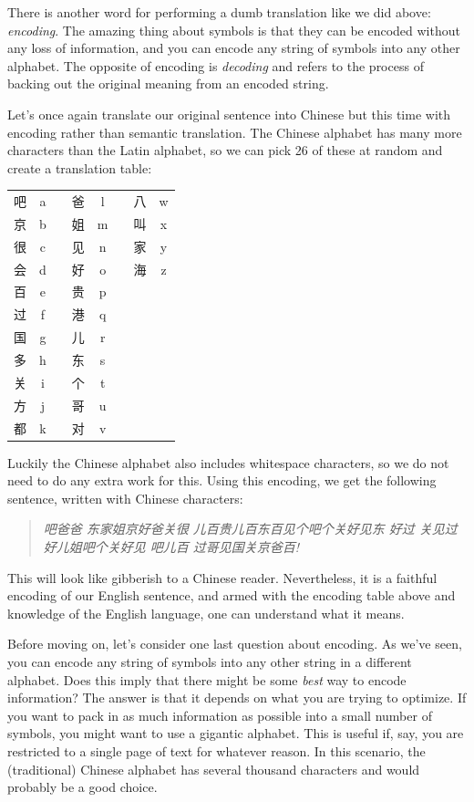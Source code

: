 \documentclass[UTF8]{book}
\begin{document}
\begin{CJK}{UTF8}{gbsn}
There is another word for performing a dumb translation like we did above: \emph{encoding}. The amazing thing about symbols is that they can be encoded without any loss of information, and you can encode any string of symbols into any other alphabet. The opposite of encoding is \emph{decoding} and refers to the process of backing out the original meaning from an encoded string.

Let's once again translate our original sentence into Chinese but this time with encoding rather than semantic translation. The Chinese alphabet has many more characters than the Latin alphabet, so we can pick 26 of these at random and create a translation table:

\begin{center}
\begin{tabular}{ cccccccc }
 吧 & a & & 爸 & l & & 八 & w \\
 京 & b & & 姐 & m & & 叫 & x \\
 很 & c & & 见 & n & & 家 & y \\
 会 & d & & 好 & o & & 海 & z \\
 百 & e & & 贵 & p & & \\
 过 & f & & 港 & q & & \\
 国 & g & & 儿 & r & & \\
 多 & h & & 东 & s & & \\
 关 & i & & 个 & t & & \\
 方 & j & & 哥 & u & & \\
 都 & k & & 对 & v & & \\
\end{tabular}
\end{center}

Luckily the Chinese alphabet also includes whitespace characters, so we do not need to do any extra work for this. Using this encoding, we get the following sentence, written with Chinese characters:

\begin{quotation}
\centering
\emph{吧爸爸 东家姐京好爸关很 儿百贵儿百东百见个吧个关好见东 好过 关见过好儿姐吧个关好见 吧儿百 过哥见国关京爸百!}
\end{quotation}

This will look like gibberish to a Chinese reader. Nevertheless, it is a faithful encoding of our English sentence, and armed with the encoding table above and knowledge of the English language, one can understand what it means.

Before moving on, let's consider one last question about encoding. As we've seen, you can encode any string of symbols into any other string in a different alphabet. Does this imply that there might be some \emph{best} way to encode information? The answer is that it depends on what you are trying to optimize. If you want to pack in as much information as possible into a small number of symbols, you might want to use a gigantic alphabet. This is useful if, say, you are restricted to a single page of text for whatever reason. In this scenario, the (traditional) Chinese alphabet has several thousand characters and would probably be a good choice.


\end{CJK}
\end{document}

